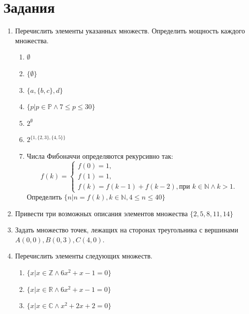 

\section*{Задания}

\begin{enumerate}
    \item Перечислить элементы указанных множеств. Определить мощность каждого множества.
    \begin{enumerate}
        \item $\emptyset$
        
        \item $\{\emptyset\}$
        
        \item $\{a,\{b,c\},d\}$
        
        \item $\{p|p\in \mathbb{P} \land 7\leq p\leq 30\}$
        
        \item $2^{\emptyset}$
        
        \item $2^{\{1,\{2,3\},\{4,5\}\}}$
        
        \item Числа Фибоначчи определяются рекурсивно так: 
        \[f(k)=
            \begin{cases}
            f(0)=1,\\
            f(1)=1,\\
            f(k)=f(k-1)+f(k-2),\text{при $k\in\mathbb{N}\land k>1$}.
            \end{cases}
        \]
        Определить $\{n|n=f(k),k\in\mathbb{N},4\leq n\leq 40\}$        
    \end{enumerate}
    
    \item Привести три возможных описания элементов множества $\{2,5,8,11,14\}$
    
    \item Задать множество точек, лежащих на сторонах треугольника с вершинами $A(0,0),B(0,3),C(4,0)$.
    
    \item Перечислить элементы следующих множеств.
    \begin{enumerate}
        \item $\{x|x\in\mathbb{Z}\land 6x^2+x-1=0\}$
        \item $\{x|x\in\mathbb{R}\land 6x^2+x-1=0\}$
        \item $\{x|x\in\mathbb{C}\land x^2+2x+2=0\}$
    \end{enumerate}
    

\end{enumerate}
